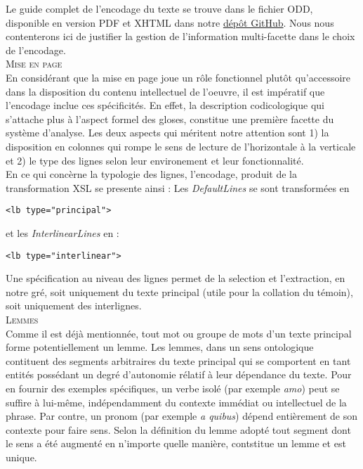\documentclass[a4paper, twoside, 12pt]{book}
\begin{document}
Le guide complet de l'encodage du texte se trouve dans le fichier ODD, disponible en version PDF et XHTML dans notre \href{https://github.com/malamatenia/Eutychès/blob/main/ODD/out/VLO41_edition_oddbyexample.pdf}{dépôt GitHub}. Nous nous contenterons ici de justifier la gestion de l'information multi-facette dans le choix de l'encodage. \\ 

\textsc{Mise en page}\\

En considérant que la mise en page joue un rôle fonctionnel plutôt qu'accessoire dans la disposition du contenu intellectuel de l'oeuvre, il est impératif que l'encodage inclue ces spécificités. En effet, la description
\og{} codicologique \fg{} qui s’attache plus à l’aspect formel des gloses, constitue une première facette du système d'analyse. Les deux aspects qui méritent notre attention sont 1) la disposition en colonnes qui rompe le sens de lecture de l'horizontale à la verticale et 2) le type des lignes selon leur environement et leur fonctionnalité.\\


En ce qui concèrne la typologie des lignes, l'encodage, produit de la transformation XSL se presente ainsi : Les \textit{DefaultLines} se sont transformées en 
\begin{verbatim} 
<lb type="principal"> 
\end{verbatim}
et les \textit{InterlinearLines} en :
\begin{verbatim} 
<lb type="interlinear">
\end{verbatim}

Une spécification au niveau des lignes permet de la selection et l'extraction, en notre gré, soit uniquement du texte principal (utile pour la collation du témoin), soit uniquement des interlignes.\\


\textsc{Lemmes}\\

Comme il est déjà mentionnée, tout mot ou groupe de mots d'un texte principal forme potentiellement un lemme. Les lemmes, dans un sens ontologique contituent des segments arbitraires du texte principal qui se comportent en tant entités possédant un degré d'autonomie rélatif à leur dépendance du texte. Pour en fournir des exemples spécifiques, un verbe isolé (par exemple \textit{amo}) peut se suffire à lui-même, indépendamment du contexte immédiat ou intellectuel de la phrase. Par contre, un pronom (par exemple \textit{a quibus}) dépend entièrement de son contexte pour faire sens. Selon la définition du lemme adopté tout segment dont le sens a été augmenté en n'importe quelle manière, contstitue un lemme et est unique. \\
\end{document}
